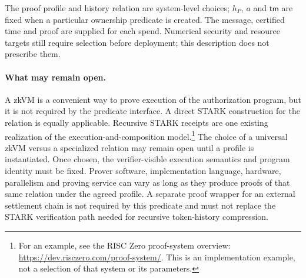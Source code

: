 The proof profile and history relation are system-level choices; $h_P$, $a$ and $\mathsf{tm}$ are fixed when a particular ownership predicate is created. The message, certified time and proof are supplied for each spend. Numerical security and resource targets still require selection before deployment; this description does not prescribe them.

\paragraph{What may remain open.}
A zkVM is a convenient way to prove execution of the authorization program, but it is not required by the predicate interface. A direct STARK construction for the relation is equally applicable. Recursive STARK receipts are one existing realization of the execution-and-composition model.\footnote{For an example, see the RISC Zero proof-system overview: \url{https://dev.risczero.com/proof-system/}. This is an implementation example, not a selection of that system or its parameters.} The choice of a universal zkVM versus a specialized relation may remain open until a profile is instantiated. Once chosen, the verifier-visible execution semantics and program identity must be fixed. Prover software, implementation language, hardware, parallelism and proving service can vary as long as they produce proofs of that same relation under the agreed profile. A separate proof wrapper for an external settlement chain is not required by this predicate and must not replace the STARK verification path needed for recursive token-history compression.
